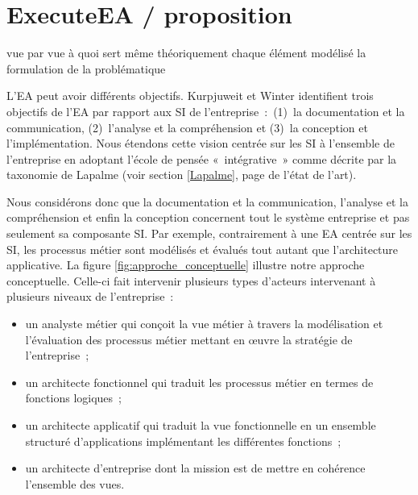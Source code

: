 \section{ExecuteEA / proposition}
vue par vue 
à quoi sert même théoriquement chaque élément modélisé 
la formulation de la problématique 



L'EA peut avoir différents objectifs. Kurpjuweit et Winter 
\cite{kurpjuweit2007viewpoint} identifient trois objectifs de l'EA par rapport 
aux SI de l'entreprise~:~(1)~la documentation et la communication, (2)~l'analyse 
et la compréhension et (3)~la conception et l'implémentation. Nous étendons 
cette vision centrée sur les SI à l'ensemble de l'entreprise en adoptant l'école 
de pensée «~intégrative~» comme décrite par la taxonomie de Lapalme (voir 
section \ref{Lapalme}, page \pageref{Lapalme} de l'état de l'art). 

Nous considérons donc que la documentation et la communication, l'analyse et la 
compréhension et enfin la conception concernent tout le système entreprise et 
pas seulement sa composante SI. Par exemple, contrairement à une EA centrée sur 
les SI, les processus métier sont modélisés et évalués tout autant que 
l'architecture applicative. La figure \ref{fig:approche_conceptuelle} illustre 
notre approche conceptuelle. Celle-ci fait intervenir plusieurs types d'acteurs 
intervenant à plusieurs niveaux de l'entreprise~:
\begin{itemize}
\item un analyste métier qui conçoit la vue métier à travers la modélisation et 
l'évaluation des processus métier mettant en œuvre la stratégie de 
l'entreprise~;
\item un architecte fonctionnel qui traduit les processus métier en termes de 
fonctions logiques~;
\item un architecte applicatif qui traduit la vue fonctionnelle en un ensemble 
structuré d'applications implémentant les différentes fonctions~;
\item un architecte d'entreprise dont la mission est de mettre en cohérence 
l'ensemble des vues.
\end{itemize}

